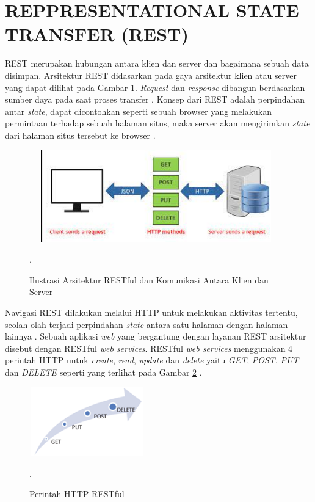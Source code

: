 \section{\uppercase{REPPRESENTATIONAL STATE TRANSFER (REST)}}
REST merupakan hubungan antara klien dan server dan bagaimana sebuah data disimpan. Arsitektur REST didasarkan pada gaya arsitektur klien atau server yang dapat dilihat pada Gambar \ref{restful}. \textit{Request} dan \textit{response} dibangun berdasarkan sumber daya pada saat proses transfer \citep{HaliliRamadani2018}. Konsep dari REST adalah perpindahan antar \textit{state}, dapat dicontohkan seperti sebuah browser yang melakukan permintaan terhadap sebuah halaman situs, maka server akan mengirimkan \textit{state} dari halaman situs tersebut ke browser \citep{Rahman2013}.
\begin{figure}[H]
	\centering
	\shadowbox
	{\includegraphics [width = 11cm, height= 4cm]{gambar/restful.jpg}}
	\caption
	{Ilustrasi Arsitektur RESTful dan Komunikasi Antara Klien dan Server \citep{HaliliRamadani2018}}.
	\label{restful}
\end{figure}
\par Navigasi REST dilakukan melalui HTTP untuk melakukan aktivitas tertentu, seolah-olah terjadi perpindahan \textit{state} antara satu halaman dengan halaman lainnya \citep{Rahman2013}. Sebuah aplikasi \textit{web} yang bergantung dengan layanan REST arsitektur disebut dengan RESTful \textit{web services}. RESTful \textit{web services} menggunakan 4 perintah HTTP untuk \textit{create}, \textit{read}, \textit{update} dan \textit{delete} yaitu \textit{GET}, \textit{POST}, \textit{PUT} dan \textit{DELETE} seperti yang terlihat pada Gambar \ref{httprestful} \citep{sinha2014}.
\begin{figure}[H]
	\centering
	\shadowbox
	{\includegraphics [width = 5cm, height= 3cm]{gambar/httprestful}}
	\caption{Perintah HTTP RESTful \citep{sinha2014}}.
	\label{httprestful}
\end{figure}

